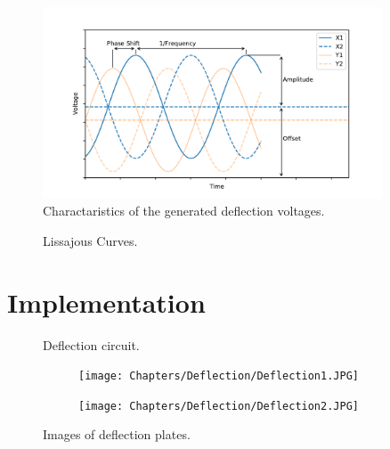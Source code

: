 \begin{figure}[ht]
	\centering
		\includegraphics[width=0.9\textwidth]{Chapters/Deflection/VoltageAspects}
	\caption{Charactaristics of the generated deflection voltages.}
	\label{fig:VoltageAspects}
\end{figure}


\begin{figure}[ht]
	\centering
	
	\begin{tikzpicture}
		
	\end{tikzpicture}
	
	\caption{Lissajous Curves.}
	\label{fig:Lissajous Curves}
\end{figure}

\section{Implementation}

\begin{figure}[ht]
	\centering
	
	\begin{tikzpicture}
		
	\end{tikzpicture}
	\caption{Deflection circuit.}
	\label{fig:deflec_circuit}
\end{figure}

\begin{figure}[ht]
	\centering
	\begin{subfigure}{0.4\textwidth}
		\centering
		\texttt{[image: Chapters/Deflection/Deflection1.JPG]}
		\caption{}
		\label{fig:circuit_phase}
	\end{subfigure}
	\hspace{0.1\textwidth}
	\begin{subfigure}{0.4\textwidth}
		\centering
		\texttt{[image: Chapters/Deflection/Deflection2.JPG]}
		\caption{}
		\label{fig:PCB_phase}
	\end{subfigure}
	\caption{Images of deflection plates.}
	\label{fig:PhaseShifter}
\end{figure}


